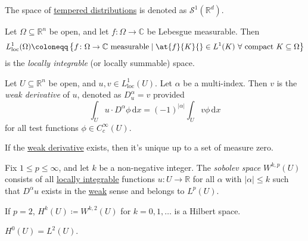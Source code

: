 \begin{notation}
	The space of \hyperref[def:tempered-distribution]{tempered distributions} is denoted as \(\mathcal{S} ^1(\mathbb{R} ^d)\).
\end{notation}

\begin{definition}\label{def:locally-integrable}
	Let \(\Omega \subseteq \mathbb{R} ^n\) be open, and let \(f\colon \Omega \to \mathbb{C} \) be Lebesgue measurable. Then
	\[
		L^1_{\text{loc} }(\Omega ) \coloneqq \left\{ f\colon \Omega \to \mathbb{C} \text{ measurable} \mid \at{f}{K}{} \in L^1(K)\ \forall \text{ compact } K \subseteq \Omega \right\}
	\]
	is the \emph{locally integrable} (or locally summable) space.
\end{definition}

\begin{definition}\label{def:weak-derivative}
	Let \(U \subseteq \mathbb{R} ^n\) be open, and \(u, v\in L^1_{\text{loc} }(U)\). Let \(\alpha\) be a multi-index. Then \(v\) is the \emph{weak derivative} of \(u\), denoted as \(D^\alpha _u = v\) provided
	\[
		\int _U u\cdot D^\alpha \phi \,\mathrm{d} x = (-1)^{\vert \alpha \vert} \int _U v \phi \,\mathrm{d} x
	\]
	for all test functions \(\phi \in C^{\infty} _c(U)\).
\end{definition}

\begin{remark}
	If the \hyperref[def:weak-derivative]{weak derivative} exists, then it's unique up to a set of measure zero.
\end{remark}

\begin{definition}\label{def:sobolev-space}
	Fix \(1 \leq p \leq \infty \), and let \(k\) be a non-negative integer. The \emph{sobolev space} \(W^{k, p}(U)\) consists of all \hyperref[def:locally-integrable]{locally integrable} functions \(u\colon U \to \mathbb{R} \) for all \(\alpha \) with \(\vert \alpha \vert \leq k\) such that \(D^\alpha u\) exists in the \hyperref[def:weak-derivative]{weak} sense and belongs to \(L^p(U)\).
\end{definition}

\begin{remark}
	If \(p = 2\), \(H^k(U) \coloneqq W^{k, 2}(U)\) for \(k = 0, 1, \dots \) is a Hilbert space.
\end{remark}

\begin{eg}
	\(H^0(U) = L^2(U)\).
\end{eg}

